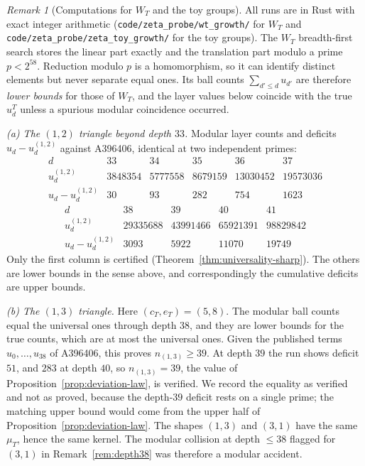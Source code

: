 \documentclass[11pt]{article}
\theoremstyle{plain}
\theoremstyle{definition}
\theoremstyle{remark}
\newtheorem{remark}[theorem]{Remark}
\begin{document}
\begin{remark}[Computations for $W_T$ and the toy groups]
\label{rem:WT-numerics}
All runs are in Rust with exact integer arithmetic
(\texttt{code/zeta\_probe/wt\_growth/} for $W_T$ and
\texttt{code/zeta\_probe/zeta\_toy\_growth/} for the toy groups). The $W_T$
breadth-first search stores the linear part exactly and the translation part
modulo a prime $p<2^{58}$. Reduction modulo $p$ is a homomorphism, so it can
identify distinct elements but never separate equal ones. Its ball counts
$\sum_{d'\le d}u_{d'}$ are therefore \emph{lower bounds} for those of $W_T$, and
the layer values below coincide with the true $u_d^T$ unless a spurious modular
coincidence occurred.

\emph{(a) The $(1,2)$ triangle beyond depth $33$.} Modular layer counts and
deficits $u_d-u_d^{(1,2)}$ against A396406, identical at two independent primes:
\[
\begin{array}{c|rrrrr}
d & 33 & 34 & 35 & 36 & 37\\\hline
u_d^{(1,2)} & 3848354 & 5777558 & 8679159 & 13030452 & 19573036\\
u_d-u_d^{(1,2)} & 30 & 93 & 282 & 754 & 1623
\end{array}
\]
\[
\begin{array}{c|rrrr}
d & 38 & 39 & 40 & 41\\\hline
u_d^{(1,2)} & 29335688 & 43991466 & 65921391 & 98829842\\
u_d-u_d^{(1,2)} & 3093 & 5922 & 11070 & 19749
\end{array}
\]
Only the first column is certified (Theorem~\ref{thm:universality-sharp}). The
others are lower bounds in the sense above, and correspondingly the cumulative
deficits are upper bounds.

\emph{(b) The $(1,3)$ triangle.} Here $(c_T,e_T)=(5,8)$. The modular ball counts
equal the universal ones through depth $38$, and they are lower bounds for the
true counts, which are at most the universal ones. Given the published terms
$u_0,\dots,u_{38}$ of A396406, this proves $n_{(1,3)}\ge39$. At depth $39$ the
run shows deficit $51$, and $283$ at depth $40$, so $n_{(1,3)}=39$, the value of
Proposition~\ref{prop:deviation-law}, is verified. We record the equality as
verified and not as proved, because the depth-$39$ deficit rests on a single
prime; the matching upper bound would come from the upper half of
Proposition~\ref{prop:deviation-law}. The shapes $(1,3)$ and $(3,1)$ have the
same $\mu_T$, hence the same kernel. The modular collision at depth $\le38$
flagged for $(3,1)$ in Remark~\ref{rem:depth38} was therefore a modular
accident.


\end{remark}
\end{document}
